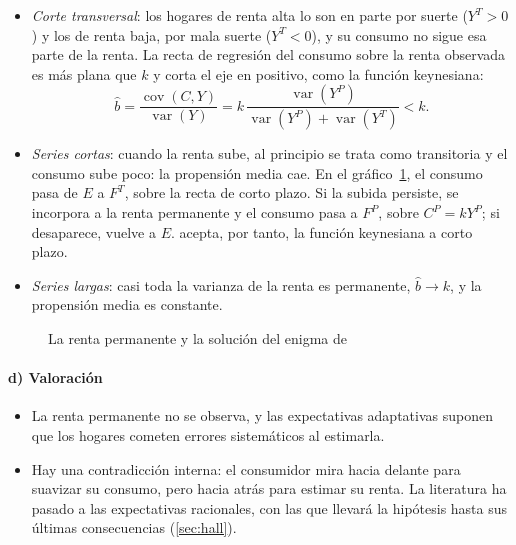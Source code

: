 \documentclass[11pt]{article}
\begin{document}
\begin{itemize}
\item \emph{Corte transversal}: los hogares de renta alta lo son en parte por suerte ($Y^T>0$) y los de renta baja, por mala suerte ($Y^T<0$), y su consumo no sigue esa parte de la renta. La recta de regresión del consumo sobre la renta observada es más plana que $k$ y corta el eje en positivo, como la función keynesiana:
  \begin{equation}
  \hat{b}=\frac{\operatorname{cov}(C,Y)}{\operatorname{var}(Y)}=k\,\frac{\operatorname{var}(Y^P)}{\operatorname{var}(Y^P)+\operatorname{var}(Y^T)}<k.\label{eq:sesgo-friedman}
  \end{equation}
\item \emph{Series cortas}: cuando la renta sube, al principio se trata como transitoria y el consumo sube poco: la propensión media cae. En el gráfico~\ref{fig:kuznets-duesenberry-friedman}, el consumo pasa de $E$ a $F^T$, sobre la recta de corto plazo. Si la subida persiste, se incorpora a la renta permanente y el consumo pasa a $F^P$, sobre $C^P=kY^P$; si desaparece, vuelve a $E$.  acepta, por tanto, la función keynesiana a corto plazo.
\item \emph{Series largas}: casi toda la varianza de la renta es permanente, $\hat{b}\to k$, y la propensión media es constante.
\end{itemize}

\begin{figure}[H]
\centering
\caption{La renta permanente y la solución del enigma de }\label{fig:kuznets-duesenberry-friedman}
\end{figure}

\paragraph{d) Valoración}

\begin{itemize}
\item La renta permanente no se observa, y las expectativas adaptativas suponen que los hogares cometen errores sistemáticos al estimarla.
\item Hay una contradicción interna: el consumidor mira hacia delante para suavizar su consumo, pero hacia atrás para estimar su renta. La literatura ha pasado a las expectativas racionales, con las que  llevará la hipótesis hasta sus últimas consecuencias (\ref{sec:hall}).
\end{itemize}
\end{document}
